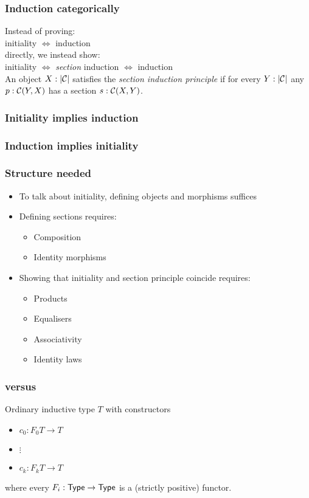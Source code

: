 \documentclass{beamer}
\begin{document}
\begin{frame}
  \frametitle{Induction categorically}
  Instead of proving: \\
  initiality $\iff$ induction \\
  directly, we instead show: \\
  initiality $\iff$ \emph{section} induction $\iff$ induction \\
  
  An object $X : | \mathcal{C} |$ satisfies the \emph{section induction
    principle} if for every $Y : | \mathcal{C} |$ any $p : \mathcal{C}(Y,X)$ has a
  section $s : \mathcal{C}(X,Y)$.
\end{frame}


\begin{frame}
  \frametitle{Initiality implies induction}
  
\end{frame}

\begin{frame}
  \frametitle{Induction implies initiality}
  

\end{frame}

\begin{frame}
  \frametitle{Structure needed}
  
  \begin{itemize}
  \item To talk about initiality, defining objects and morphisms suffices
  \item Defining sections requires:
    \begin{itemize}
    \item Composition
    \item Identity morphisms
    \end{itemize}
  \item Showing that initiality and section principle coincide requires:
    \begin{itemize}
    \item Products
    \item Equalisers
    \item Associativity
    \item Identity laws
    \end{itemize}
  \end{itemize}
\end{frame}

\begin{frame}
  \frametitle{\Hits versus \oits}
Ordinary inductive type $T$ with constructors
\begin{itemize}
  \item $c_0 : F_0 T \to T$
  \item $\vdots$
  \item $c_k : F_k T \to T$
\end{itemize}

where every $F_i : \mathsf{Type} \to \mathsf{Type}$ is a (strictly positive) functor.
\end{frame}
\end{document}
